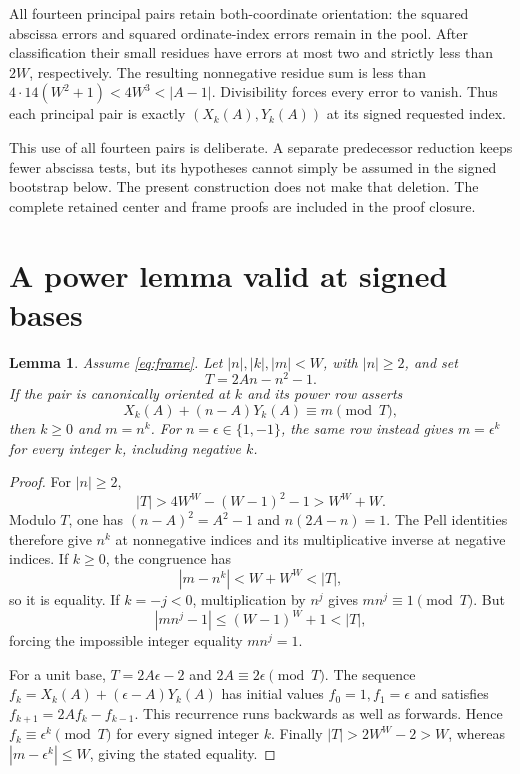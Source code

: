 \documentclass[11pt]{article}
\newtheorem{lemma}[theorem]{Lemma}
\theoremstyle{definition}\newtheorem{definition}[theorem]{Definition}
\begin{document}
All fourteen principal pairs retain both-coordinate orientation:
the squared abscissa errors and squared ordinate-index errors remain
in the pool. After classification their small residues have errors at
most two and strictly less than \(2W\), respectively. The resulting
nonnegative residue sum is less than
\(4\cdot14(W^2+1)<4W^3<|A-1|\). Divisibility forces every error to vanish.
Thus each principal pair is exactly
\((X_k(A),Y_k(A))\) at its signed requested index.

This use of all fourteen pairs is deliberate. A separate predecessor
reduction keeps fewer abscissa tests, but its hypotheses cannot simply
be assumed in the signed bootstrap below. The present construction
does not make that deletion. The complete retained center and frame
proofs are included in the proof closure.

\section{A power lemma valid at signed bases}

\begin{lemma}\label{lem:signed-power}
Assume \eqref{eq:frame}. Let \(|n|,|k|,|m|<W\), with \(|n|\ge2\), and set
\[
 T=2An-n^2-1.
\]
If the pair is canonically oriented at \(k\) and its power row asserts
\[
 X_k(A)+(n-A)Y_k(A)\equiv m\pmod T,
\]
then \(k\ge0\) and \(m=n^k\).
For \(n=\epsilon\in\{1,-1\}\), the same row instead gives
\(m=\epsilon^k\) for every integer \(k\), including negative \(k\).
\end{lemma}

\begin{proof}
For \(|n|\ge2\),
\[
 |T|>4W^W-(W-1)^2-1>W^W+W.
\]
Modulo \(T\), one has
\((n-A)^2=A^2-1\) and \(n(2A-n)=1\).
The Pell identities therefore give \(n^k\) at nonnegative indices
and its multiplicative inverse at negative indices. If \(k\ge0\),
the congruence has
\[
 |m-n^k|<W+W^W<|T|,
\]
so it is equality. If \(k=-j<0\), multiplication by \(n^j\) gives
\(mn^j\equiv1\pmod T\). But
\[
 |mn^j-1|\le(W-1)^W+1<|T|,
\]
forcing the impossible integer equality \(mn^j=1\).

For a unit base, \(T=2A\epsilon-2\) and \(2A\equiv2\epsilon\pmod T\).
The sequence
\(f_k=X_k(A)+(\epsilon-A)Y_k(A)\) has initial values
\(f_0=1,f_1=\epsilon\) and satisfies
\(f_{k+1}=2Af_k-f_{k-1}\). This recurrence runs backwards as well
as forwards. Hence \(f_k\equiv\epsilon^k\pmod T\) for every signed
integer \(k\). Finally \(|T|>2W^W-2>W\), whereas
\(|m-\epsilon^k|\le W\), giving the stated equality.
\end{proof}
\end{document}
